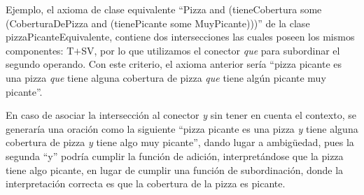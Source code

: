 Ejemplo, el axioma de clase equivalente ``Pizza and (tieneCobertura some (CoberturaDePizza and (tienePicante some MuyPicante)))'' de la clase pizzaPicanteEquivalente, contiene dos intersecciones las cuales poseen los mismos componentes: T$+$SV, por lo que utilizamos el conector \emph{que} para subordinar el segundo operando. Con este criterio, el axioma anterior sería ``pizza picante es una pizza \emph{que} tiene alguna cobertura de pizza \emph{que} tiene algún picante muy picante''.

En caso de asociar la intersección al conector \emph{y} sin tener en cuenta el contexto, se generaría una oración como la siguiente ``pizza picante es una pizza \emph{y} tiene alguna cobertura de pizza \emph{y} tiene algo muy picante'', dando lugar a ambigüedad, pues la segunda ``y'' podría cumplir la función de adición, interpretándose que la pizza tiene algo picante, en lugar de cumplir una función de subordinación, donde la interpretación correcta es que la cobertura de la pizza es picante. 



